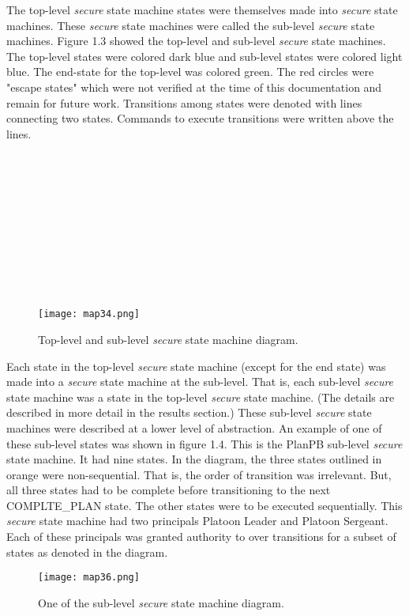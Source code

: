 The top-level \emph{secure} state machine states were themselves made into \emph{secure} state machines. These
\emph{secure} state machines were called the sub-level \emph{secure} state machines.  Figure 1.3  showed the
top-level and sub-level \emph{secure} state machines.  The top-level states were colored dark blue and
sub-level states were colored light blue.  The end-state for the top-level was colored green. The
red circles were "escape states" which were not verified at the time of this documentation and
remain for future work.  Transitions among states were denoted with lines connecting two states.
Commands to execute transitions were written above the lines.  \\\\\\\\\\\\\\\\\\\\\\

\begin{figure}[h]
  \centering
  \texttt{[image: map34.png]}
  \caption{Top-level and sub-level \emph{secure} state machine diagram.}
\end{figure}

Each state in the top-level \emph{secure} state machine (except for the end state) was made into a
\emph{secure} state machine at the sub-level.  That is, each sub-level \emph{secure} state machine
was a state in the top-level \emph{secure} state machine. (The details are described in more detail
in the results section.)  These sub-level \emph{secure} state machines were described at a lower
level of abstraction.  An example of one of these sub-level states was shown in figure 1.4.  This is
the PlanPB sub-level \emph{secure} state machine.  It had nine states.  In the diagram, the three
states outlined in orange were non-sequential.  That is, the order of transition was irrelevant.
But, all three states had to be complete before transitioning to the next COMPLTE_PLAN state. The
other states were to be executed sequentially.  This \emph{secure} state machine had two principals
Platoon Leader and Platoon Sergeant.  Each of these principals was granted authority to over transitions
for a subset of states as denoted in the diagram.

\begin{figure}[h]
  \centering
  \texttt{[image: map36.png]}
  \caption{One of the sub-level \emph{secure} state machine diagram.}
\end{figure}

